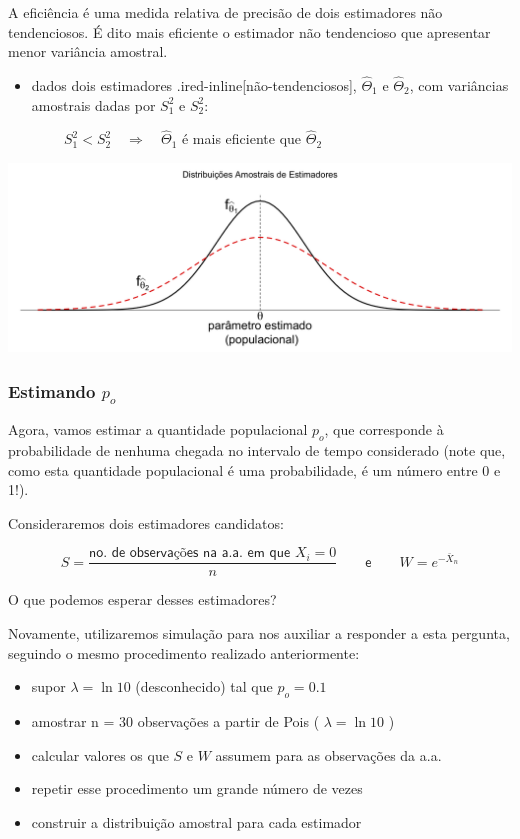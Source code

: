 \documentclass[
]{book}
\providecommand{\tightlist}{%
  \setlength{\itemsep}{0pt}\setlength{\parskip}{0pt}}
\theoremstyle{definition}
\theoremstyle{definition}
\theoremstyle{definition}
\theoremstyle{remark}
\begin{document}
A eficiência é uma medida relativa de precisão de dois estimadores não tendenciosos. É dito mais eficiente o estimador não tendencioso que apresentar menor variância amostral.

\begin{itemize}
\tightlist
\item
  dados dois estimadores .ired-inline{[}não-tendenciosos{]}, \(\hat\Theta_1\) e \(\hat\Theta_2\), com variâncias amostrais dadas por \(S_1^2\) e \(S_2^2\):
\end{itemize}

\(\qquad \qquad S_1^2 < S_2^2 \quad \Longrightarrow \quad \hat{\Theta}_1\) é mais eficiente que \(\hat{\Theta}_2\)

\includegraphics[width=1\linewidth]{img/efficient-estimator}

\hypertarget{estimando-p_o-1}{%
\subsubsection*{\texorpdfstring{Estimando \(p_o\)}{Estimando p\_o}}\label{estimando-p_o-1}}

Agora, vamos estimar a quantidade populacional \(p_o\), que corresponde à probabilidade de nenhuma chegada no intervalo de tempo considerado (note que, como esta quantidade populacional é uma probabilidade, é um número entre 0 e 1!).

Consideraremos dois estimadores candidatos:

\[S = \frac{\textsf{no. de observações na a.a. em que }X_i = 0}{n} \qquad \textsf{e} \qquad W = e^{-\bar{X}_n}\]

O que podemos esperar desses estimadores?

Novamente, utilizaremos simulação para nos auxiliar a responder a esta pergunta, seguindo o mesmo procedimento realizado anteriormente:

\begin{itemize}
\tightlist
\item
  supor \(\lambda = \ln 10\) (desconhecido) tal que \(p_o = 0.1\)
\item
  amostrar n = 30 observações a partir de Pois ( \(\lambda = \ln 10\) )\\
\item
  calcular valores os que \(S\) e \(W\) assumem para as observações da a.a.\\
\item
  repetir esse procedimento um grande número de vezes
\item
  construir a distribuição amostral para cada estimador
\end{itemize}
\end{document}
